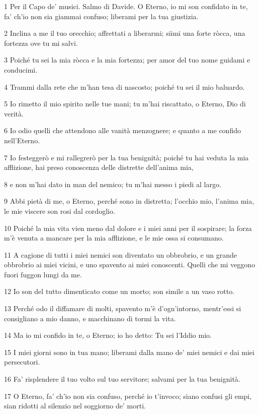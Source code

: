 \par 1 Per il Capo de' musici. Salmo di Davide. O Eterno, io mi son confidato in te, fa' ch'io non sia giammai confuso; liberami per la tua giustizia.
\par 2 Inclina a me il tuo orecchio; affrettati a liberarmi; siimi una forte ròcca, una fortezza ove tu mi salvi.
\par 3 Poiché tu sei la mia ròcca e la mia fortezza; per amor del tuo nome guidami e conducimi.
\par 4 Trammi dalla rete che m'han tesa di nascosto; poiché tu sei il mio baluardo.
\par 5 Io rimetto il mio spirito nelle tue mani; tu m'hai riscattato, o Eterno, Dio di verità.
\par 6 Io odio quelli che attendono alle vanità menzognere; e quanto a me confido nell'Eterno.
\par 7 Io festeggerò e mi rallegrerò per la tua benignità; poiché tu hai veduta la mia afflizione, hai preso conoscenza delle distrette dell'anima mia,
\par 8 e non m'hai dato in man del nemico; tu m'hai messo i piedi al largo.
\par 9 Abbi pietà di me, o Eterno, perché sono in distretta; l'occhio mio, l'anima mia, le mie viscere son rosi dal cordoglio.
\par 10 Poiché la mia vita vien meno dal dolore e i miei anni per il sospirare; la forza m'è venuta a mancare per la mia afflizione, e le mie ossa si consumano.
\par 11 A cagione di tutti i miei nemici son diventato un obbrobrio, e un grande obbrobrio ai miei vicini, e uno spavento ai miei conoscenti. Quelli che mi veggono fuori fuggon lungi da me.
\par 12 Io son del tutto dimenticato come un morto; son simile a un vaso rotto.
\par 13 Perché odo il diffamare di molti, spavento m'è d'ogn'intorno, mentr'essi si consigliano a mio danno, e macchinano di tormi la vita.
\par 14 Ma io mi confido in te, o Eterno; io ho detto: Tu sei l'Iddio mio.
\par 15 I miei giorni sono in tua mano; liberami dalla mano de' miei nemici e dai miei persecutori.
\par 16 Fa' risplendere il tuo volto sul tuo servitore; salvami per la tua benignità.
\par 17 O Eterno, fa' ch'io non sia confuso, perché io t'invoco; siano confusi gli empi, sian ridotti al silenzio nel soggiorno de' morti.
